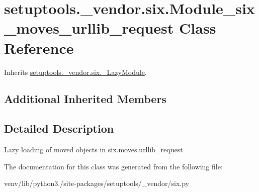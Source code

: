 \hypertarget{classsetuptools_1_1__vendor_1_1six_1_1_module__six__moves__urllib__request}{}\section{setuptools.\+\_\+vendor.\+six.\+Module\+\_\+six\+\_\+moves\+\_\+urllib\+\_\+request Class Reference}
\label{classsetuptools_1_1__vendor_1_1six_1_1_module__six__moves__urllib__request}


Inherits \hyperlink{classsetuptools_1_1__vendor_1_1six_1_1___lazy_module}{setuptools.\+\_\+vendor.\+six.\+\_\+\+Lazy\+Module}.

\subsection*{Additional Inherited Members}


\subsection{Detailed Description}
\begin{DoxyVerb}Lazy loading of moved objects in six.moves.urllib_request\end{DoxyVerb}
 

The documentation for this class was generated from the following file\+:\begin{DoxyCompactItemize}
\item 
venv/lib/python3./site-\/packages/setuptools/\+\_\+vendor/six.\+py\end{DoxyCompactItemize}

